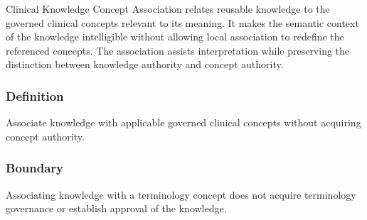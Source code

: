 Clinical Knowledge Concept Association relates reusable knowledge to the governed clinical concepts relevant to its meaning. It makes the semantic context of the knowledge intelligible without allowing local association to redefine the referenced concepts. The association assists interpretation while preserving the distinction between knowledge authority and concept authority.

\subsubsection*{Definition}

Associate knowledge with applicable governed clinical concepts without acquiring concept authority.

\subsubsection*{Boundary}

Associating knowledge with a terminology concept does not acquire terminology governance or establish approval of the knowledge.

